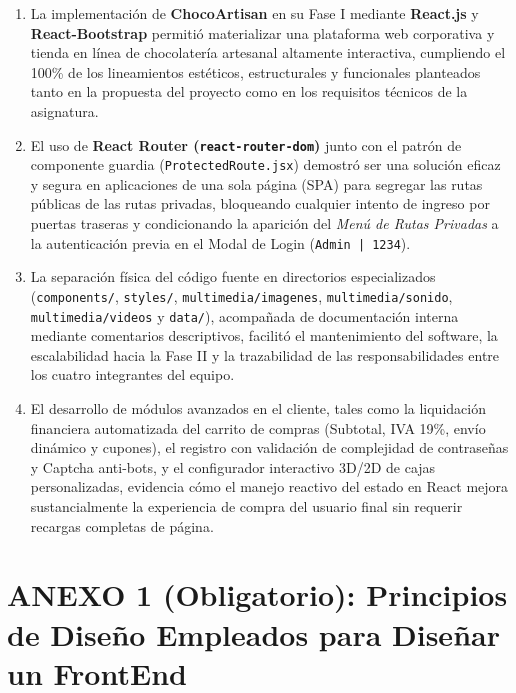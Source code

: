 \documentclass[12pt,letterpaper]{article}
\begin{document}
\begin{enumerate}[leftmargin=1.2cm]
  \item La implementación de \textbf{ChocoArtisan} en su Fase I mediante \textbf{React.js} y \textbf{React-Bootstrap} permitió materializar una plataforma web corporativa y tienda en línea de chocolatería artesanal altamente interactiva, cumpliendo el 100\% de los lineamientos estéticos, estructurales y funcionales planteados tanto en la propuesta del proyecto como en los requisitos técnicos de la asignatura.
  \item El uso de \textbf{React Router (\texttt{react-router-dom})} junto con el patrón de componente guardia (\texttt{ProtectedRoute.jsx}) demostró ser una solución eficaz y segura en aplicaciones de una sola página (SPA) para segregar las rutas públicas de las rutas privadas, bloqueando cualquier intento de ingreso por puertas traseras y condicionando la aparición del \textit{Menú de Rutas Privadas} a la autenticación previa en el Modal de Login (\texttt{Admin | 1234}).
  \item La separación física del código fuente en directorios especializados (\texttt{components/}, \texttt{styles/}, \texttt{multimedia/imagenes}, \texttt{multimedia/sonido}, \texttt{multimedia/videos} y \texttt{data/}), acompañada de documentación interna mediante comentarios descriptivos, facilitó el mantenimiento del software, la escalabilidad hacia la Fase II y la trazabilidad de las responsabilidades entre los cuatro integrantes del equipo.
  \item El desarrollo de módulos avanzados en el cliente, tales como la liquidación financiera automatizada del carrito de compras (Subtotal, IVA 19\%, envío dinámico y cupones), el registro con validación de complejidad de contraseñas y Captcha anti-bots, y el configurador interactivo 3D/2D de cajas personalizadas, evidencia cómo el manejo reactivo del estado en React mejora sustancialmente la experiencia de compra del usuario final sin requerir recargas completas de página.
\end{enumerate}

\newpage

\section*{ANEXO 1 (Obligatorio): Principios de Diseño Empleados para Diseñar un FrontEnd}
\end{document}

